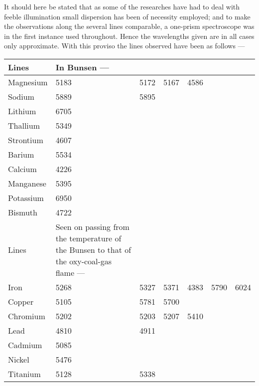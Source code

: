 \documentclass[a4paper, 12pt, oneside, polutonikogreek, english]{article}
\begin{document}
It should here be stated that as some of the researches have had to deal with feeble illumination small dispersion has been of necessity employed; and to make the observations along the several lines comparable, a one-prism spectroscope was in the first instance used throughout. Hence the wavelengths given are in all cases only approximate. With this proviso the lines observed have been as follows ---
\begin{table}[H]
    \centering
    \footnotesize
    \begin{tabular}{l p{34mm} r r r r r}
          \hline
         Lines    &  In Bunsen ---                                       &     &     &     &     & ~ \\ \hline
         Magnesium  & 5183 & 5172 & 5167 & 4586 &     &     \\ 
         Sodium   & 5889 & 5895 &     &     &     &     \\ 
         Lithium   & 6705 &     &     &     &     &     \\ 
         Thallium  & 5349 &     &     &     &     &     \\ 
         Strontium  & 4607 &     &     &     &     &     \\ 
         Barium   & 5534 &     &     &     &     &     \\ 
         Calcium   & 4226 &     &     &     &     &     \\ 
         Manganese  & 5395 &     &     &     &     &     \\ 
         Potassium  & 6950 &     &     &     &     &     \\ 
         Bismuth   & 4722 &     &     &     &     &     \\\hline \hline
         Lines    &  Seen on passing from the temperature of the Bunsen to that of the oxy-coal-gas flame ---  &     &     &     &     &     \\ \hline
         Iron    & 5268 & 5327 & 5371 & 4383 & 5790 & 6024 \\ 
         Copper   & 5105 & 5781 & 5700 &     &     &     \\ 
         Chromium  & 5202 & 5203 & 5207 & 5410 &     &     \\ 
         Lead    & 4810 & 4911 &     &     &     &     \\ 
         Cadmium   & 5085 &     &     &     &     &     \\ 
         Nickel   & 5476 &     &     &     &     &     \\ 
         Titanium  & 5128 & 5338 &     &     &     &     \\ 

\end{tabular}
\end{table}
\end{document}
